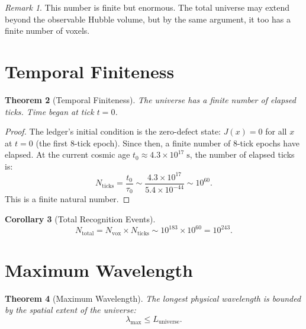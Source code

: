 \documentclass[12pt,a4paper]{article}
\newtheorem{theorem}{Theorem}[section]
\newtheorem{corollary}[theorem]{Corollary}
\theoremstyle{definition}
\theoremstyle{remark}
\newtheorem{remark}[theorem]{Remark}
\begin{document}
\begin{remark}
This number is finite but enormous.  The total universe may extend
beyond the observable Hubble volume, but by the same argument,
it too has a finite number of voxels.
\end{remark}

\section{Temporal Finiteness}
\label{sec:temporal}

\begin{theorem}[Temporal Finiteness]
\label{thm:temporal}
The universe has a finite number of elapsed ticks.  Time began at
tick $t = 0$.
\end{theorem}

\begin{proof}
The ledger's initial condition is the zero-defect state: $J(x) = 0$
for all $x$ at $t = 0$ (the first 8-tick epoch).  Since then, a
finite number of 8-tick epochs have elapsed.  At the current cosmic
age $t_0 \approx 4.3 \times 10^{17}\;\mathrm{s}$, the number of
elapsed ticks is:
\begin{equation}
  N_{\mathrm{ticks}} = \frac{t_0}{\tau_0} \sim
  \frac{4.3 \times 10^{17}}{5.4 \times 10^{-44}}
  \sim 10^{60}.
\end{equation}
This is a finite natural number.
\end{proof}

\begin{corollary}[Total Recognition Events]
\begin{equation}
  N_{\mathrm{total}} = N_{\mathrm{vox}} \times N_{\mathrm{ticks}}
  \sim 10^{183} \times 10^{60} = 10^{243}.
\end{equation}
\end{corollary}

\section{Maximum Wavelength}
\label{sec:maxlambda}

\begin{theorem}[Maximum Wavelength]
The longest physical wavelength is bounded by the spatial extent of
the universe:
\begin{equation}
  \lambda_{\max} \leq L_{\mathrm{universe}}.
\end{equation}
\end{theorem}
\end{document}
